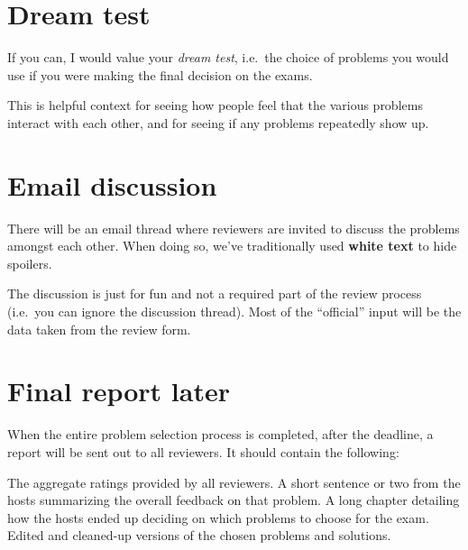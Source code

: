 \section{Dream test}
If you can, I would value your \emph{dream test},
i.e.\ the choice of problems you would use
if you were making the final decision on the exams.

This is helpful context for seeing how people
feel that the various problems interact with each other,
and for seeing if any problems repeatedly show up.

\section{Email discussion}
There will be an email thread where reviewers
are invited to discuss the problems amongst each other.
When doing so, we've traditionally used \textbf{white text}
to hide spoilers.

The discussion is just for fun and not a required part
of the review process (i.e.\ you can ignore the discussion thread).
Most of the ``official'' input will be the data
taken from the review form.

\section{Final report later}
When the entire problem selection process is completed,
after the deadline, a report will be sent out to all reviewers.
It should contain the following:
\begin{itemize}
  \ii The aggregate ratings provided by all reviewers.
  \ii A short sentence or two from the hosts
  summarizing the overall feedback on that problem.
  \ii A long chapter detailing how the hosts ended up
  deciding on which problems to choose for the exam.
  \ii Edited and cleaned-up versions of the
  chosen problems and solutions.
\end{itemize}
